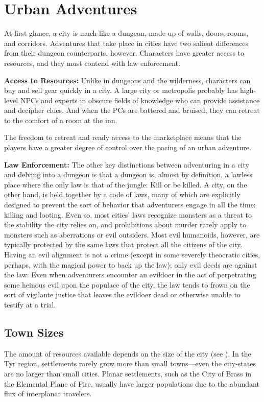 \section{Urban Adventures}
At first glance, a city is much like a dungeon, made up of walls, doors, rooms, and corridors. Adventures that take place in cities have two salient differences from their dungeon counterparts, however. Characters have greater access to resources, and they must contend with law enforcement.

\textbf{Access to Resources:} Unlike in dungeons and the wilderness, characters can buy and sell gear quickly in a city. A large city or metropolis probably has high-level NPCs and experts in obscure fields of knowledge who can provide assistance and decipher clues. And when the PCs are battered and bruised, they can retreat to the comfort of a room at the inn.

The freedom to retreat and ready access to the marketplace means that the players have a greater degree of control over the pacing of an urban adventure.

\textbf{Law Enforcement:} The other key distinctions between adventuring in a city and delving into a dungeon is that a dungeon is, almost by definition, a lawless place where the only law is that of the jungle: Kill or be killed. A city, on the other hand, is held together by a code of laws, many of which are explicitly designed to prevent the sort of behavior that adventurers engage in all the time: killing and looting. Even so, most cities' laws recognize monsters as a threat to the stability the city relies on, and prohibitions about murder rarely apply to monsters such as aberrations or evil outsiders. Most evil humanoids, however, are typically protected by the same laws that protect all the citizens of the city. Having an evil alignment is not a crime (except in some severely theocratic cities, perhaps, with the magical power to back up the law); only evil deeds are against the law. Even when adventurers encounter an evildoer in the act of perpetrating some heinous evil upon the populace of the city, the law tends to frown on the sort of vigilante justice that leaves the evildoer dead or otherwise unable to testify at a trial.


\subsection{Town Sizes}
The amount of resources available depends on the size of the city (see ). In the Tyr region, settlements rarely grow more than small towns---even the city-states are no larger than small cities. Planar settlements, such as the City of Brass in the Elemental Plane of Fire, usually have larger populations due to the abundant flux of interplanar travelers.

